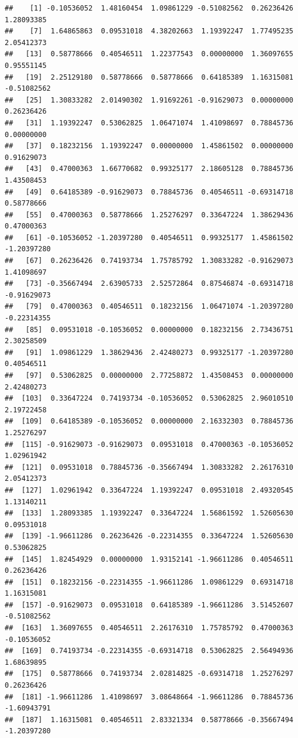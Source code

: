\documentclass[
]{article}
\begin{document}
\begin{verbatim}
##    [1] -0.10536052  1.48160454  1.09861229 -0.51082562  0.26236426  1.28093385
##    [7]  1.64865863  0.09531018  4.38202663  1.19392247  1.77495235  2.05412373
##   [13]  0.58778666  0.40546511  1.22377543  0.00000000  1.36097655  0.95551145
##   [19]  2.25129180  0.58778666  0.58778666  0.64185389  1.16315081 -0.51082562
##   [25]  1.30833282  2.01490302  1.91692261 -0.91629073  0.00000000  0.26236426
##   [31]  1.19392247  0.53062825  1.06471074  1.41098697  0.78845736  0.00000000
##   [37]  0.18232156  1.19392247  0.00000000  1.45861502  0.00000000  0.91629073
##   [43]  0.47000363  1.66770682  0.99325177  2.18605128  0.78845736  1.43508453
##   [49]  0.64185389 -0.91629073  0.78845736  0.40546511 -0.69314718  0.58778666
##   [55]  0.47000363  0.58778666  1.25276297  0.33647224  1.38629436  0.47000363
##   [61] -0.10536052 -1.20397280  0.40546511  0.99325177  1.45861502 -1.20397280
##   [67]  0.26236426  0.74193734  1.75785792  1.30833282 -0.91629073  1.41098697
##   [73] -0.35667494  2.63905733  2.52572864  0.87546874 -0.69314718 -0.91629073
##   [79]  0.47000363  0.40546511  0.18232156  1.06471074 -1.20397280 -0.22314355
##   [85]  0.09531018 -0.10536052  0.00000000  0.18232156  2.73436751  2.30258509
##   [91]  1.09861229  1.38629436  2.42480273  0.99325177 -1.20397280  0.40546511
##   [97]  0.53062825  0.00000000  2.77258872  1.43508453  0.00000000  2.42480273
##  [103]  0.33647224  0.74193734 -0.10536052  0.53062825  2.96010510  2.19722458
##  [109]  0.64185389 -0.10536052  0.00000000  2.16332303  0.78845736  1.25276297
##  [115] -0.91629073 -0.91629073  0.09531018  0.47000363 -0.10536052  1.02961942
##  [121]  0.09531018  0.78845736 -0.35667494  1.30833282  2.26176310  2.05412373
##  [127]  1.02961942  0.33647224  1.19392247  0.09531018  2.49320545  1.13140211
##  [133]  1.28093385  1.19392247  0.33647224  1.56861592  1.52605630  0.09531018
##  [139] -1.96611286  0.26236426 -0.22314355  0.33647224  1.52605630  0.53062825
##  [145]  1.82454929  0.00000000  1.93152141 -1.96611286  0.40546511  0.26236426
##  [151]  0.18232156 -0.22314355 -1.96611286  1.09861229  0.69314718  1.16315081
##  [157] -0.91629073  0.09531018  0.64185389 -1.96611286  3.51452607 -0.51082562
##  [163]  1.36097655  0.40546511  2.26176310  1.75785792  0.47000363 -0.10536052
##  [169]  0.74193734 -0.22314355 -0.69314718  0.53062825  2.56494936  1.68639895
##  [175]  0.58778666  0.74193734  2.02814825 -0.69314718  1.25276297  0.26236426
##  [181] -1.96611286  1.41098697  3.08648664 -1.96611286  0.78845736 -1.60943791
##  [187]  1.16315081  0.40546511  2.83321334  0.58778666 -0.35667494 -1.20397280

\end{verbatim}
\end{document}
